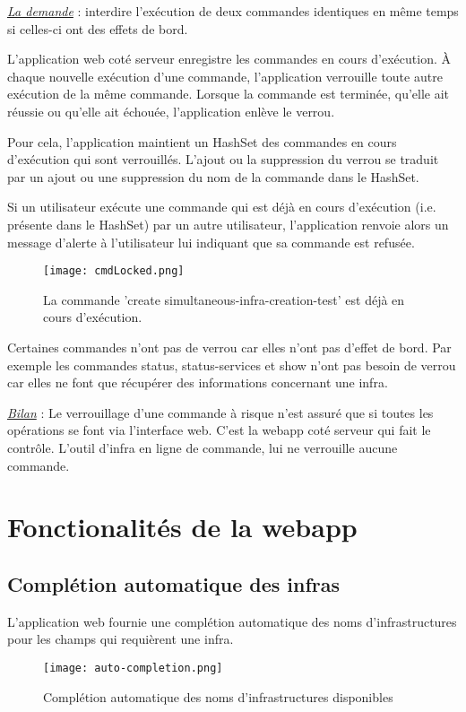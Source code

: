 \underline{\textit{La demande}} : interdire l'exécution de deux commandes
identiques en même temps si celles-ci ont des effets de bord.

L'application web coté serveur enregistre les commandes en cours d'exécution.
À chaque nouvelle exécution d'une commande, l'application verrouille toute autre
exécution de la même commande. Lorsque la commande est terminée, qu'elle ait
réussie ou qu'elle ait échouée, l'application enlève le verrou.

Pour cela, l'application maintient un HashSet des commandes en cours d'exécution
qui sont verrouillés. L'ajout ou la suppression du verrou se traduit par un
ajout ou une suppression du nom de la commande dans le HashSet.

Si un utilisateur exécute une commande qui est déjà en cours d'exécution
(i.e. présente dans le HashSet) par un autre utilisateur, l'application renvoie
alors un message d'alerte à l'utilisateur lui indiquant que sa commande est refusée.

\begin{figure}[H]
  \texttt{[image: cmdLocked.png]}
  \caption{La commande 'create simultaneous-infra-creation-test' est déjà en
    cours d'exécution.}
\end{figure}

Certaines commandes n'ont pas de verrou car elles n'ont pas d'effet de bord.
Par exemple les commandes status, status-services et show n'ont pas besoin
de verrou car elles ne font que récupérer des informations concernant une infra.

\underline{\textit{Bilan}} : Le verrouillage d'une commande à risque n'est
assuré que si toutes les opérations se font via l'interface web. C'est la webapp
coté serveur qui fait le contrôle. L'outil d'infra en ligne de commande, lui ne
verrouille aucune commande.

\section{Fonctionalités de la webapp}

\subsection{Complétion automatique des infras}

L'application web fournie une complétion automatique des noms d'infrastructures
pour les champs qui requièrent une infra.

\begin{figure}[H]
  \texttt{[image: auto-completion.png]}
  \caption{Complétion automatique des noms d'infrastructures disponibles}
\end{figure}

